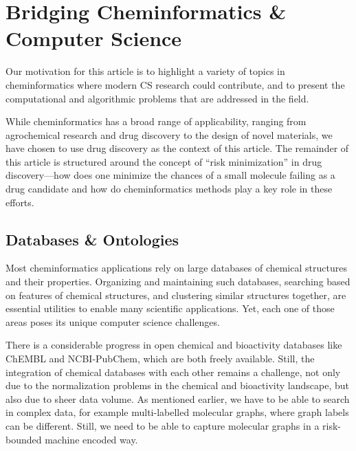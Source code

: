 \documentclass{sig-alternate}
\begin{document}
\section{Bridging Cheminformatics \& Computer Science}

Our motivation for this article is to highlight a variety of topics in
cheminformatics where modern CS research could contribute, and
to present the computational and algorithmic problems
that are addressed in the field.

While cheminformatics has a broad range of applicability, ranging from
agrochemical research and drug discovery to the design of novel
materials, we have chosen to use drug discovery as the context of this
article. The remainder of this article is structured around the
concept of ``risk minimization'' in drug discovery---how does one
minimize the chances of a small molecule failing as a drug candidate
and how do cheminformatics methods play a key role in these efforts.

\subsection{Databases \& Ontologies}
\label{sec:databases}


Most cheminformatics applications rely on large databases of chemical structures
and their properties. Organizing and maintaining such databases, searching based
on features of chemical structures, and clustering similar structures together,
are essential utilities to enable many scientific applications. Yet, each one of
those areas poses its unique computer science challenges.

There is a considerable progress in open chemical and bioactivity databases like
ChEMBL and NCBI-PubChem, which are both freely available. Still, the integration
of chemical databases with each other remains a challenge, not only due to the
normalization problems in the chemical and bioactivity landscape, but also due
to sheer data volume. As mentioned earlier, we have to be able to
search in complex data, for example multi-labelled molecular graphs, where
graph labels can be different. Still, we need to be able to capture
molecular graphs in a risk-bounded machine encoded way.
\end{document}
